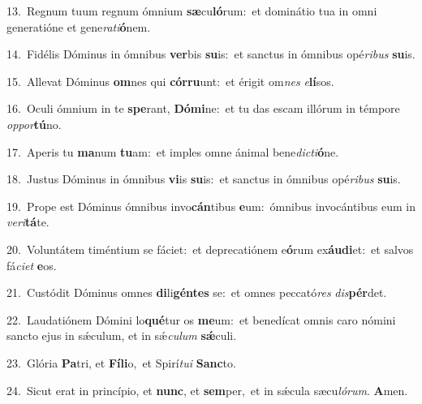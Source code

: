 {\numbfont\textcolor{\numbcolor}{13.}}~Regnum tuum regnum ómnium \textbf{sæ}\-cu\-\textbf{ló}\-rum:~\star et dominátio tua in omni generatióne et gene\-\textit{ra}\-\textit{ti}\textbf{ó}nem.\par
{\numbfont\textcolor{\numbcolor}{14.}}~Fidélis Dóminus in ómnibus \textbf{ver}\-bis \textbf{su}\-is:~\star et sanctus in ómnibus opé\-\textit{ri}\-\textit{bus} \textbf{su}\-is.\par
{\numbfont\textcolor{\numbcolor}{15.}}~Allevat Dóminus \textbf{om}\-nes qui \textbf{cór}\-\textbf{ru}unt:~\star et érigit om\textit{nes} \textit{e}\-\textbf{lí}sos.\par
{\numbfont\textcolor{\numbcolor}{16.}}~Oculi ómnium in te \textbf{spe}\-rant, \textbf{Dó}\-\textbf{mi}ne:~\star et tu das escam illórum in témpore \textit{op}\-\textit{por}\textbf{tú}no.\par
{\numbfont\textcolor{\numbcolor}{17.}}~Aperis tu \textbf{ma}\-num \textbf{tu}\-am:~\star et imples omne ánimal bene\-\textit{dic}\-\textit{ti}\textbf{ó}ne.\par
{\numbfont\textcolor{\numbcolor}{18.}}~Justus Dóminus in ómnibus \textbf{vi}\-is \textbf{su}\-is:~\star et sanctus in ómnibus opé\-\textit{ri}\-\textit{bus} \textbf{su}\-is.\par
{\numbfont\textcolor{\numbcolor}{19.}}~Prope est Dóminus ómnibus invo\-\textbf{cán}\-tibus \textbf{e}\-um:~\star ómnibus invocántibus eum in \textit{ve}\-\textit{ri}\textbf{tá}te.\par
{\numbfont\textcolor{\numbcolor}{20.}}~Voluntátem timéntium se fáciet:~\dagger et deprecatiónem e\-\textbf{ó}\-rum ex\-\textbf{áu}\-\textbf{di}et:~\star et salvos fá\-\textit{ci}\-\textit{et} \textbf{e}\-os.\par
{\numbfont\textcolor{\numbcolor}{21.}}~Custódit Dóminus omnes \textbf{di}\-li\-\textbf{gén}\-\textbf{tes} se:~\star et omnes peccató\textit{res} \textit{dis}\-\textbf{pér}det.\par
{\numbfont\textcolor{\numbcolor}{22.}}~Laudatiónem Dómini lo\-\textbf{qué}\-tur os \textbf{me}\-um:~\star et benedícat omnis caro nómini sancto ejus in sǽculum, et in sǽ\-\textit{cu}\-\textit{lum} \textbf{sǽ}\-culi.\par
{\numbfont\textcolor{\numbcolor}{23.}}~Glória \textbf{Pa}\-tri, et \textbf{Fí}\-\textbf{li}o,~\star et Spirí\-\textit{tu}\-\textit{i} \textbf{Sanc}\-to.\par
{\numbfont\textcolor{\numbcolor}{24.}}~Sicut erat in princípio, et \textbf{nunc}\-, et \textbf{sem}\-per,~\star et in sǽcula sæcu\-\textit{ló}\-\textit{rum}. \textbf{A}\-men.\par
